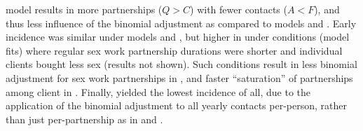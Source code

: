 model  results in more partnerships ($Q > C$) with fewer contacts ($A < F$),
and thus less influence of the binomial adjustment as compared to models  and .
Early incidence was similar under models  and ,
but higher in  under conditions (model fits) where
regular sex work partnership durations were shorter and
individual clients bought less sex (results not shown).
Such conditions result in less binomial adjustment for sex work partnerships in ,
and faster ``saturation'' of partnerships among client in .
Finally,  yielded the lowest incidence of all,
due to the application of the binomial adjustment to all yearly contacts per-person,
rather than just per-partnership as in  and .
\par
\clearpage
